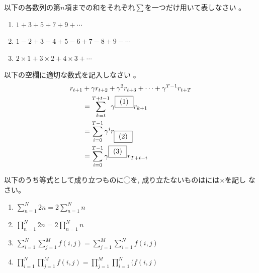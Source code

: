 \documentclass[twocolumn,11pt]{jarticle}
\begin{document}
\nquestion
以下の各数列の第$n$項までの和をそれぞれ$\sum$を一つだけ用いて表しなさい
。
\begin{enumerate}
\item\label{item:1+3+5} $\displaystyle 1+3+5+7+9+\cdots$
\item\label{item:1-2+3-4} $\displaystyle 1-2+3-4+5-6+7-8+9-\cdots$
\item\label{item:2x1+3x2} $\displaystyle 2\times 1 + 3\times 2+ 4\times 3 +\cdots$
\end{enumerate}

\nquestion
以下の空欄に適切な数式を記入しなさい
。
\begin{align}
  r_{t+1}&+\gamma r_{t+2}+\gamma^2 r_{t+3}+\cdots+\gamma^{T-1}r_{t+T}\notag\\
  &=\sum_{k=t}^{T+t-1}\gamma^{\fbox{~{(1)}~}}r_{k+1}\notag\\
  & =\sum_{i=0}^{T-1}\gamma^ir_{\fbox{~{(2)}~}}\notag\\
  & =\sum_{i=0}^{T-1}\gamma^{\fbox{~{(3)}~}}r_{T+t-i}\notag
\end{align}

\nquestion
以下のうち等式として成り立つものに◯を, 成り立たないものはには×を記し
なさい。
\begin{enumerate}
\item $\displaystyle\sum_{n=1}^N2n=2\sum_{n=1}^Nn$
\item $\displaystyle\prod_{n=1}^N2n=2\prod_{n=1}^Nn$
\item
  $\displaystyle\sum_{i=1}^N\sum_{j=1}^Mf(i,j)=\sum_{j=1}^M\sum_{i=1}^Nf(i,j)$
\item $\prod_{i=1}^N\prod_{j=1}^Mf(i,j)=\prod_{j=1}^M\prod_{i=1}^N(f(i,j)$
\end{enumerate}
\end{document}
